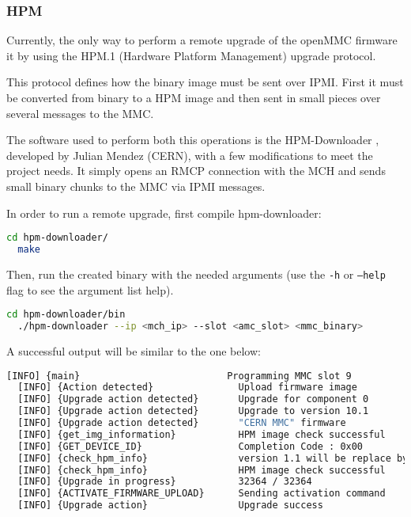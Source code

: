 \documentclass[letterpaper,12pt, titlepage]{article}
\begin{document}
\subsubsection{HPM}
Currently, the only way to perform a remote upgrade of the openMMC firmware it by using the HPM.1 (Hardware Platform Management) upgrade protocol.

This protocol defines how the binary image must be sent over IPMI. First it must be converted from binary to a HPM image and then sent in small pieces over several messages to the MMC.

The software used to perform both this operations is the HPM-Downloader \cite{hpm-github}, developed by Julian Mendez (CERN), with a few modifications to meet the project needs. It simply opens an RMCP connection with the MCH and sends small binary chunks to the MMC via IPMI messages.

In order to run a remote upgrade, first compile hpm-downloader:

\begin{lstlisting}[language=bash]
  cd hpm-downloader/
  make
\end{lstlisting}

Then, run the created binary with the needed arguments (use the \texttt{-h} or \texttt{--help} flag to see the argument list help).

\begin{lstlisting}[language=bash]
  cd hpm-downloader/bin
  ./hpm-downloader --ip <mch_ip> --slot <amc_slot> <mmc_binary>
\end{lstlisting}

A successful output will be similar to the one below:
\begin{lstlisting}[language=bash]
  [INFO] {main}                          Programming MMC slot 9
  [INFO] {Action detected}               Upload firmware image
  [INFO] {Upgrade action detected}       Upgrade for component 0
  [INFO] {Upgrade action detected}       Upgrade to version 10.1
  [INFO] {Upgrade action detected}       "CERN MMC" firmware
  [INFO] {get_img_information}           HPM image check successful
  [INFO] {GET_DEVICE_ID}                 Completion Code : 0x00
  [INFO] {check_hpm_info}                version 1.1 will be replace by 0.1
  [INFO] {check_hpm_info}                HPM image check successful
  [INFO] {Upgrade in progress}           32364 / 32364
  [INFO] {ACTIVATE_FIRMWARE_UPLOAD}      Sending activation command
  [INFO] {Upgrade action}                Upgrade success
\end{lstlisting}
\end{document}
